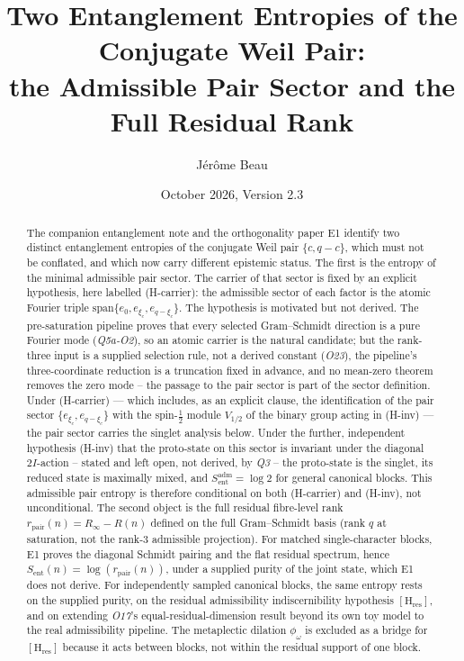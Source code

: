 \documentclass[11pt]{article}
\title{Two Entanglement Entropies of the Conjugate Weil Pair:\\
the Admissible Pair Sector and the Full Residual Rank}
\author{J\'er\^ome Beau}
\date{October 2026, Version 2.3}
\begin{document}
  \maketitle

  \begin{abstract}
    The companion entanglement note and the orthogonality paper E1 identify two distinct
    entanglement entropies of the conjugate Weil pair $\{c,q-c\}$, which must not be
    conflated, and which now carry different epistemic status.
    The first is the entropy of the minimal admissible pair sector.
    The carrier of that sector is fixed by an explicit hypothesis, here labelled (H-carrier):
    the admissible sector of each factor is the atomic Fourier triple
    $\mathrm{span}\{e_0,e_{\xi_c},e_{q-\xi_c}\}$.
    The hypothesis is motivated but not derived.
    The pre-saturation pipeline proves that every selected Gram--Schmidt direction is a pure
    Fourier mode (\emph{Q5a-O2}), so an atomic carrier is the natural candidate; but the
    rank-three input is a supplied selection rule, not a derived constant (\emph{O23}), the
    pipeline's three-coordinate reduction is a truncation fixed in advance, and no mean-zero
    theorem removes the zero mode -- the passage to the pair sector is part of the sector
    definition.
    Under (H-carrier) --- which includes, as an explicit clause, the identification of the
    pair sector $\{e_{\xi_c},e_{q-\xi_c}\}$ with the spin-$\tfrac12$ module $V_{1/2}$ of the
    binary group acting in (H-inv) --- the pair sector carries the singlet analysis below.
    Under the further, independent hypothesis (H-inv) that the proto-state on this sector is
    invariant under the diagonal $2I$-action -- stated and left open, not derived, by \emph{Q3}
    -- the proto-state is the singlet, its reduced state is maximally mixed, and
    $S_{\mathrm{ent}}^{\mathrm{adm}}=\log 2$ for general canonical blocks.
    This admissible pair entropy is therefore conditional on both (H-carrier) and (H-inv), not
    unconditional.
    The second object is the full residual fibre-level rank $r_{\mathrm{pair}}(n)=R_\infty-R(n)$
    defined on the full Gram--Schmidt basis (rank $q$ at saturation, not the rank-3 admissible
    projection).
    For matched single-character blocks, E1 proves the diagonal Schmidt pairing and the flat
    residual spectrum, hence $S_{\mathrm{ent}}(n)=\log(r_{\mathrm{pair}}(n))$, under a supplied
    purity of the joint state, which E1 does not derive.
    For independently sampled canonical blocks, the same entropy rests on the supplied purity, on
    the residual admissibility indiscernibility hypothesis $[\mathrm{H}_{\mathrm{res}}]$, and on
    extending \emph{O17}'s equal-residual-dimension result beyond its own toy model to the real
    admissibility pipeline.
    The metaplectic dilation $\phi_\omega$ is excluded as a bridge for $[\mathrm{H}_{\mathrm{res}}]$
    because it acts between blocks, not within the residual support of one block.
  \end{abstract}
\end{document}
